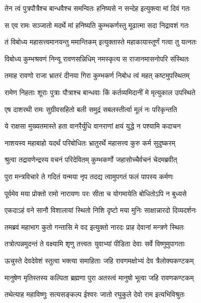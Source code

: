 \twolineshloka
{तेन त्वं पुत्रपौत्रैश्च बान्धवैश्च समन्वितः}
{हनिष्यसे न सन्देह इत्युक्त्वा मां दिवं गतः} %

\twolineshloka
{स एव रामः सञ्जातो मदर्थे मां हनिष्यति}
{कुम्भकर्णस्तु मूढात्मा सदा निद्रावशं गतः} %

\twolineshloka
{तं विबोध्य महासत्त्वमानयन्तु ममान्तिकम्}
{इत्युक्तास्ते महाकायास्तूर्णं गत्वा तु यत्नतः} %

\twolineshloka
{विबोध्य कुम्भश्रवणं निन्यू रावणसन्निधिम्}
{नमस्कृत्य स राजानमासनोपरि संस्थितः} %

\twolineshloka
{तमाह रावणो राजा भ्रातरं दीनया गिरा}
{कुम्भकर्ण निबोध त्वं महत् कष्टमुपस्थितम्} %

\twolineshloka
{रामेण निहताः शूराः पुत्राः पौत्राश्च बान्धवाः}
{किं कर्तव्यमिदानीं मे मृत्युकाल उपस्थिते} %

\twolineshloka
{एष दाशरथी रामः सुग्रीवसहितो बली}
{समुद्रं सबलस्तीर्त्वा मूलं नः परिकृन्तति} %

\twolineshloka
{ये राक्षसा मुख्यतमास्ते हता वानरैर्युधि}
{वानराणां क्षयं युद्धे न पश्यामि कदाचन} %

\twolineshloka
{नाशयस्व महाबाहो यदर्थं परिबोधितः}
{भ्रातुरर्थे महासत्त्व कुरु कर्म सुदुष्करम्} %

\twolineshloka
{श्रुत्वा तद्रावणेन्द्रस्य वचनं परिदेवितम्}
{कुम्भकर्णो जहासोच्चैर्वचनं चेदमब्रवीत्} %

\twolineshloka
{पुरा मन्त्रविचारे ते गदितं यन्मया नृप}
{तदद्य त्वामुपगतं फलं पापस्य कर्मणः} %

\twolineshloka
{पूर्वमेव मया प्रोक्तो रामो नारायणः परः}
{सीता च योगमायेति बोधितोऽपि न बुध्यसे} %

\twolineshloka
{एकदाऽहं वने सानौ विशालायां स्थितो निशि}
{दृष्टो मया मुनिः साक्षान्नारदो दिव्यदर्शनः} %

\twolineshloka
{तमब्रवं महाभाग कुतो गन्तासि मे वद}
{इत्युक्तो नारदः प्राह देवानां मन्त्रणे स्थितः} %

\twolineshloka
{तत्रोत्पन्नमुदन्तं ते वक्ष्यामि शृणु तत्त्वतः}
{युवाभ्यां पीडिता देवाः सर्वे विष्णुमुपागताः} %

\twolineshloka
{ऊचुस्ते देवदेवेशं स्तुत्वा भक्त्या समाहिताः}
{जहि रावणमक्षोभ्यं देव त्रैलोक्यकण्टकम्} %

\twolineshloka
{मानुषेण मृतिस्तस्य कल्पिता ब्रह्मणा पुरा}
{अतस्त्वं मानुषो भूत्वा जहि रावणकण्टकम्} %

\twolineshloka
{तथेत्याह महाविष्णुः सत्यसङ्कल्प ईश्वरः}
{जातो रघुकुले देवो राम इत्यभिविश्रुतः} %

